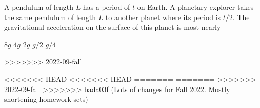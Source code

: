 \documentclass{../../oss-apphys-exam}
\begin{document}
\begin{multicols*}{2}
\begin{questions}
    \question A pendulum of length $L$ has a period of $t$ on Earth. A
    planetary explorer takes the same pendulum of length $L$ to another planet
    where its period is $t/2$. The gravitational acceleration on the surface of
    this planet is most nearly
    \begin{choices}
      \choice $8g$
      \choice $4g$
      \choice $2g$
      \choice $g/2$
      \choice $g/4$
    \end{choices}
    \columnbreak

    

>>>>>>> 2022-09-fall
    
<<<<<<< HEAD
<<<<<<< HEAD
=======
=======
>>>>>>> 2022-09-fall
    \columnbreak
>>>>>>> bada03f (Lots of changes for Fall 2022. Mostly shortening homework sets)
    

\end{questions}
\end{multicols*}
\end{document}
